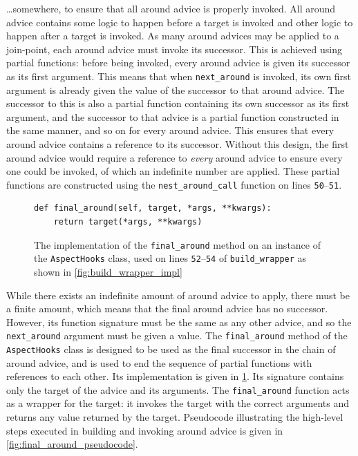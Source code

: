\ldots{}somewhere, to ensure that all around advice is properly invoked. All
around advice contains some logic to happen before a target is invoked and other
logic to happen after a target is invoked. As many around advices may be applied
to a join-point, each around advice must invoke its successor. This is achieved
using partial functions: before being invoked, every around advice is given its
successor as its first argument. This means that when \lstinline{next_around} is
invoked, its own first argument is already given the value of the successor to
that around advice. The successor to this is also a partial function containing
its own successor as its first argument, and the successor to that advice is a
partial function constructed in the same manner, and so on for every around
advice. This ensures that every around advice contains a reference to its
successor. Without this design, the first around advice would require a
reference to \emph{every} around advice to ensure every one could be invoked, of
which an indefinite number are applied. These partial functions are constructed
using the \lstinline{nest_around_call} function on lines
\texttt{50}--\texttt{51}.

\begin{figure}
    \begin{lstlisting}[style=footnotesize_python]
def final_around(self, target, *args, **kwargs):
    return target(*args, **kwargs)
    \end{lstlisting}
    \caption{The implementation of the \lstinline{final_around} method on an
    instance of the \lstinline{AspectHooks} class, used on lines
    \texttt{52}--\texttt{54} of \lstinline{build_wrapper} as shown in \cref{fig:build_wrapper_impl}}
    \label{fig:final_around_impl}
\end{figure}


While there exists an indefinite amount of around advice to apply, there must be
a finite amount, which means that the final around advice has no successor.
However, its function signature must be the same as any other advice, and so the
\lstinline{next_around} argument must be given a value. The
\lstinline{final_around} method of the \lstinline{AspectHooks} class is designed
to be used as the final successor in the chain of around advice, and is used to
end the sequence of partial functions with references to each other. Its
implementation is given in \cref{fig:final_around_impl}. Its
signature contains only the target of the advice and its arguments. The
\lstinline{final_around} function acts as a wrapper for the target: it invokes
the target with the correct arguments and returns any value returned by the
target. Pseudocode illustrating the high-level steps executed in building and
invoking around advice is given in \cref{fig:final_around_pseudocode}.

